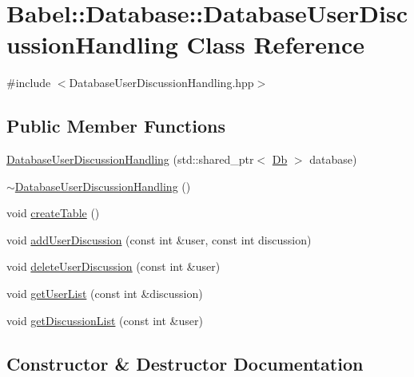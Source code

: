 \hypertarget{classBabel_1_1Database_1_1DatabaseUserDiscussionHandling}{}\section{Babel\+:\+:Database\+:\+:Database\+User\+Discussion\+Handling Class Reference}
\label{classBabel_1_1Database_1_1DatabaseUserDiscussionHandling}


{\ttfamily \#include $<$Database\+User\+Discussion\+Handling.\+hpp$>$}

\subsection*{Public Member Functions}
\begin{DoxyCompactItemize}
\item 
\hyperlink{classBabel_1_1Database_1_1DatabaseUserDiscussionHandling_a5d54f847bf50ca48f0d2a2ea58182b20}{Database\+User\+Discussion\+Handling} (std\+::shared\+\_\+ptr$<$ \hyperlink{classBabel_1_1Database_1_1Db}{Db} $>$ database)
\item 
\hyperlink{classBabel_1_1Database_1_1DatabaseUserDiscussionHandling_a4ee88a4eabdf123dd4c315df340bd760}{$\sim$\+Database\+User\+Discussion\+Handling} ()
\item 
void \hyperlink{classBabel_1_1Database_1_1DatabaseUserDiscussionHandling_a88f9ef86219a80855c021df406c8d40f}{create\+Table} ()
\item 
void \hyperlink{classBabel_1_1Database_1_1DatabaseUserDiscussionHandling_ad39879052a69f34be4bfa0b274d2dac8}{add\+User\+Discussion} (const int \&user, const int discussion)
\item 
void \hyperlink{classBabel_1_1Database_1_1DatabaseUserDiscussionHandling_a75e2a7a011c99b533e16724675a13f82}{delete\+User\+Discussion} (const int \&user)
\item 
void \hyperlink{classBabel_1_1Database_1_1DatabaseUserDiscussionHandling_aecbc7fc0f110b187166e6b9e16d9d817}{get\+User\+List} (const int \&discussion)
\item 
void \hyperlink{classBabel_1_1Database_1_1DatabaseUserDiscussionHandling_a33da6f4f800a18fadca95c51f30b1e44}{get\+Discussion\+List} (const int \&user)
\end{DoxyCompactItemize}


\subsection{Constructor \& Destructor Documentation}
\mbox{\label{classBabel_1_1Database_1_1DatabaseUserDiscussionHandling_a5d54f847bf50ca48f0d2a2ea58182b20}} 
